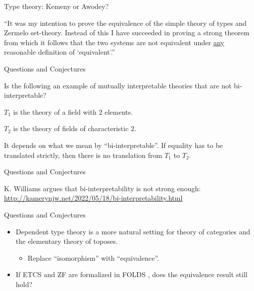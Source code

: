 \documentclass[ignorenonframetext,fleqn]{beamer}
\newcommand{\2}{\mathcal}
\begin{document}
\begin{frame}{Type theory: Kemeny or Awodey?}

  ``It was my intention to prove the equivalence of the simple theory
  of types and Zermelo set-theory. Instead of this I have succeeded in
  proving a strong theorem from which it follows that the two systems
  are not equivalent under \underline{any} reasonable definition of
  `equivalent'.'' \citep{kemeny}

  \nocite{mathias} \nocite{pinter}


\end{frame}

\begin{frame}{Questions and Conjectures}

  Is the following an example of mutually interpretable theories that
  are not bi-interpretable?

\bigskip $T_1$ is the theory of a field with $2$ elements.

$T_2$ is the theory of fields of characteristic $2$.

\bigskip It depends on what we mean by ``bi-interpretable''. If
equality has to be translated strictly, then there is no translation
from $T_1$ to $T_2$.


\end{frame}

\begin{frame}{Questions and Conjectures}

  K. Williams argues that bi-interpretability is not strong enough: 
  \url{http://kamerynjw.net/2022/05/18/bi-interpretability.html}

\end{frame}

\begin{frame}{Questions and Conjectures}

  \begin{itemize}
  \item Dependent type theory is a more natural setting for theory of
    categories and the elementary theory of toposes.
    \begin{itemize}
    \item Replace ``isomorphism'' with ``equivalence''.
    \end{itemize}
  \item If ETCS and ZF are formalized in FOLDS \citep{makkai}, does
    the equivalence result still hold?
  \end{itemize}

\end{frame}
\end{document}
